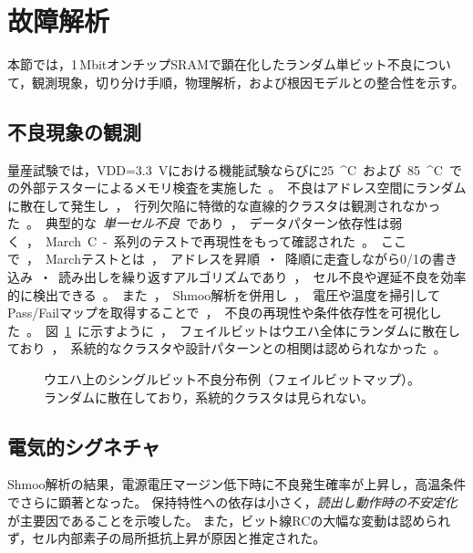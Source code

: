 \documentclass[conference]{IEEEtran}
\begin{document}
\section{故障解析}
本節では，1\,MbitオンチップSRAMで顕在化したランダム単ビット不良について，観測現象，切り分け手順，物理解析，および根因モデルとの整合性を示す。

\subsection{不良現象の観測}
量産試験では，VDD=\SI{3.3}{V}における機能試験ならびに\SI{25}{^\circ C}および\SI{85}{^\circ C}での外部テスターによるメモリ検査を実施した。  
不良はアドレス空間にランダムに散在して発生し，行列欠陥に特徴的な直線的クラスタは観測されなかった。  
典型的な\emph{単一セル不良}であり，データパターン依存性は弱く，March C-系列のテストで再現性をもって確認された。  

ここで，Marchテストとは，アドレスを昇順・降順に走査しながら0/1の書き込み・読み出しを繰り返すアルゴリズムであり，セル不良や遅延不良を効率的に検出できる。  
また，Shmoo解析を併用し，電圧や温度を掃引してPass/Failマップを取得することで，不良の再現性や条件依存性を可視化した。
図\ref{fig:failmap}に示すように，フェイルビットはウエハ全体にランダムに散在しており，
系統的なクラスタや設計パターンとの相関は認められなかった。

\begin{figure}[!t]
\centering
{}
\caption{ウエハ上のシングルビット不良分布例（フェイルビットマップ）。ランダムに散在しており，系統的クラスタは見られない。}
\label{fig:failmap}
\end{figure}

\subsection{電気的シグネチャ}
Shmoo解析の結果，電源電圧マージン低下時に不良発生確率が上昇し，高温条件でさらに顕著となった。  
保持特性への依存は小さく，\emph{読出し動作時の不安定化}が主要因であることを示唆した。  
また，ビット線RCの大幅な変動は認められず，セル内部素子の局所抵抗上昇が原因と推定された。
\end{document}
